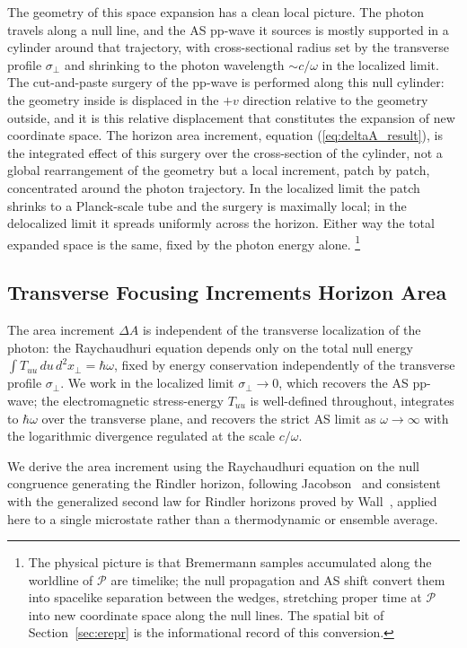 \documentclass[12pt,a4paper]{article}
\begin{document}
The geometry of this space expansion has a clean local 
picture. The photon travels along a null line, and the 
AS pp-wave it sources is mostly supported in a cylinder around 
that trajectory, with cross-sectional radius set by the 
transverse profile $\sigma_\perp$ and shrinking to the 
photon wavelength $\sim c/\omega$ in the localized limit. 
The cut-and-paste surgery of the pp-wave is performed 
along this null cylinder: the geometry inside is 
displaced in the $+v$ direction relative to the geometry 
outside, and it is this relative displacement that 
constitutes the expansion of new coordinate space. The 
horizon area increment, equation (\ref{eq:deltaA_result}),
is the integrated effect of this surgery over the 
cross-section of the cylinder, not a global 
rearrangement of the geometry but a local increment, 
patch by patch, concentrated around the photon 
trajectory. In the localized limit the patch shrinks 
to a Planck-scale tube and the surgery is maximally 
local; in the delocalized limit it spreads uniformly 
across the horizon. Either way the total expanded space 
is the same, fixed by the photon energy alone. \footnote{The physical picture is that Bremermann samples 
accumulated along the worldline of $\mathcal{P}$ are 
timelike; the null propagation and AS shift convert them 
into spacelike separation between the wedges, stretching 
proper time at $\mathcal{P}$ into new coordinate space 
along the null lines. The spatial bit of 
Section~\ref{sec:erepr} is the informational record of 
this conversion.}

\subsection{Transverse Focusing Increments Horizon Area}
\label{sec:deltaA}

The area increment $\Delta A$ is independent of the transverse 
localization of the photon: the Raychaudhuri equation depends 
only on the total null energy $\int T_{uu}\,du\,d^2x_\perp = 
\hbar\omega$, fixed by energy conservation independently of 
the transverse profile $\sigma_\perp$. We work in the localized 
limit $\sigma_\perp \to 0$, which recovers the AS pp-wave; the 
electromagnetic stress-energy $T_{uu}$ is well-defined 
throughout, integrates to $\hbar\omega$ over the transverse 
plane, and recovers the strict AS limit as $\omega \to \infty$ 
with the logarithmic divergence regulated at the scale $c/\omega$.

We derive the area increment using the Raychaudhuri 
equation on the null congruence generating the Rindler 
horizon, following Jacobson~\cite{jacobson1995thermodynamics} 
and consistent with the generalized second law for 
Rindler horizons proved by Wall~\cite{wall2010proof}, 
applied here to a single microstate rather than a 
thermodynamic or ensemble average.
\end{document}
